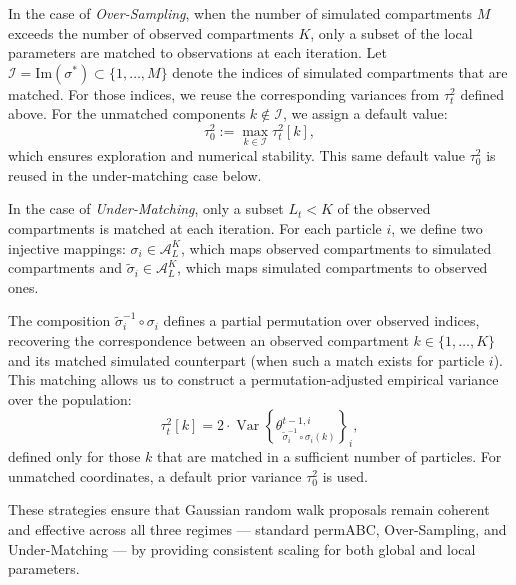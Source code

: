 In the case of \emph{Over-Sampling}, when the number of simulated compartments \( M \) exceeds the number of observed compartments \( K \), only a subset of the local parameters are matched to observations at each iteration. Let \( \mathcal{I} = \mathrm{Im}(\sigma^*) \subset \{1, \dots, M\} \) denote the indices of simulated compartments that are matched. For those indices, we reuse the corresponding variances from \( \tau_t^2 \) defined above. For the unmatched components \( k \notin \mathcal{I} \), we assign a default value:
\[
\tau_0^2 := \max_{k \in \mathcal{I}} \tau_t^2[k],
\]
which ensures exploration and numerical stability. This same default value \( \tau_0^2 \) is reused in the under-matching case below.





In the case of \emph{Under-Matching}, only a subset \( L_t < K \) of the observed compartments is matched at each iteration. For each particle \( i \), we define two injective mappings: \( \sigma_i \in \mathcal{A}_L^K \), which maps observed compartments to simulated compartments and \( \tilde{\sigma}_i \in \mathcal{A}_L^K \), which maps simulated compartments to observed ones.

The composition \( \tilde{\sigma}_i^{-1} \circ \sigma_i \) defines a partial permutation over observed indices, recovering the correspondence between an observed compartment \( k \in \{1, \dots, K\} \) and its matched simulated counterpart (when such a match exists for particle \( i \)). This matching allows us to construct a permutation-adjusted empirical variance over the population:
\[
\tau_t^2[k] = 2 \cdot \operatorname{Var} \left\{ \theta^{t-1,i}_{\tilde{\sigma}_i^{-1} \circ \sigma_i(k)} \right\}_i,
\]
defined only for those \( k \) that are matched in a sufficient number of particles. For unmatched coordinates, a default prior variance \( \tau_0^2 \) is used.





These strategies ensure that Gaussian random walk proposals remain coherent and effective across all three regimes — standard permABC, Over-Sampling, and Under-Matching — by providing consistent scaling for both global and local parameters.

